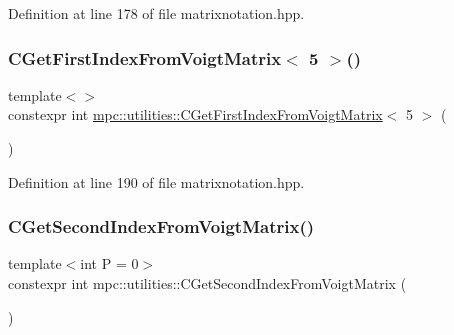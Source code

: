 Definition at line 178 of file matrixnotation.\+hpp.

\mbox{\label{namespacempc_1_1utilities_a84defb8639ca919a8620092ce15ffd4c}} 
\subsubsection{\texorpdfstring{C\+Get\+First\+Index\+From\+Voigt\+Matrix$<$ 5 $>$()}{CGetFirstIndexFromVoigtMatrix< 5 >()}}
{\footnotesize\ttfamily template$<$$>$ \\
constexpr int \mbox{\hyperlink{namespacempc_1_1utilities_acb1091d4fd58c0821eeeba68a43146ac}{mpc\+::utilities\+::\+C\+Get\+First\+Index\+From\+Voigt\+Matrix}}$<$ 5 $>$ (\begin{DoxyParamCaption}{ }\end{DoxyParamCaption})\hspace{0.3cm}{\ttfamily [inline]}}



Definition at line 190 of file matrixnotation.\+hpp.

\mbox{\label{namespacempc_1_1utilities_a094a324d81b996e8397336286264dfcd}} 
\subsubsection{\texorpdfstring{C\+Get\+Second\+Index\+From\+Voigt\+Matrix()}{CGetSecondIndexFromVoigtMatrix()}}
{\footnotesize\ttfamily template$<$int P = 0$>$ \\
constexpr int mpc\+::utilities\+::\+C\+Get\+Second\+Index\+From\+Voigt\+Matrix (\begin{DoxyParamCaption}{ }\end{DoxyParamCaption})\hspace{0.3cm}{\ttfamily [inline]}}



